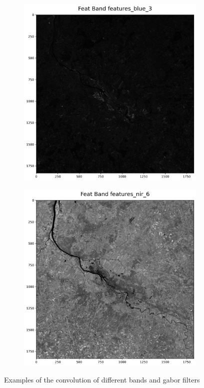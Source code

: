 \documentclass[12pt,a4paper, english,twoside]{scrartcl}
\begin{document}
\begin{figure}
        \begin{subfigure}[b]{0.38\textwidth}
          \includegraphics[width=\textwidth]{img/Features_blue3.png}
        \end{subfigure}

        \begin{subfigure}[b]{0.38\textwidth}
          \includegraphics[width=\textwidth]{img/Features_nir_6.png}
        \end{subfigure}
       \caption{Examples of the convolution of different bands and gabor filters\label{fig:gaborresults}}
       \vspace{-3cm}
      \end{figure} 
\end{document}
